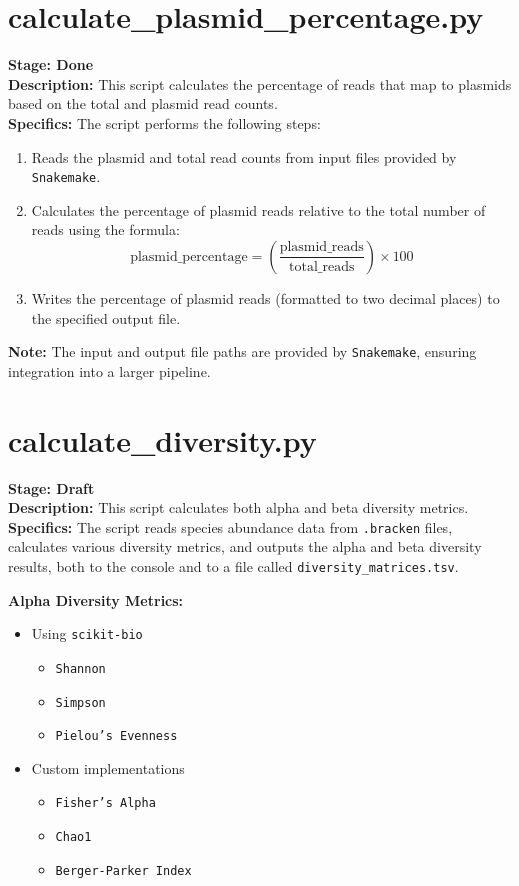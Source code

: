 \documentclass[11pt]{report}
\begin{document}
{\section{calculate\_plasmid\_percentage.py}
\textbf{Stage: Done} \\   
\textbf{Description:} This script calculates the percentage of reads that map to plasmids based on the total and plasmid read counts. \\
\textbf{Specifics:} The script performs the following steps:
\begin{enumerate}
	\item Reads the plasmid and total read counts from input files provided by \texttt{Snakemake}.
	\item Calculates the percentage of plasmid reads relative to the total number of reads using the formula: 
	\[ \text{plasmid\_percentage} = \left( \frac{\text{plasmid\_reads}}{\text{total\_reads}} \right) \times 100 \]
	\item Writes the percentage of plasmid reads (formatted to two decimal places) to the specified output file.
\end{enumerate}
\textbf{Note:} The input and output file paths are provided by \texttt{Snakemake}, ensuring integration into a larger pipeline. \\


\linenumbers*
\section{calculate\_diversity.py}
\textbf{Stage: Draft} \\   
\textbf{Description:} This script calculates both alpha and beta diversity metrics.\\
\textbf{Specifics:} The script reads species abundance data from \texttt{.bracken} files, calculates various diversity metrics, and outputs the alpha and beta diversity results, both to the console and to a file called \texttt{diversity\_matrices.tsv}.

\begin{multicols}{2}
	\textbf{Alpha Diversity Metrics:}
	\begin{itemize}
		\item Using \texttt{scikit-bio}
		\begin{itemize}
			\item \texttt{Shannon}
			\item \texttt{Simpson}
			\item \texttt{Pielou's Evenness}
		\end{itemize}
		\item Custom implementations
		\begin{itemize}
			\item \texttt{Fisher's Alpha}
			\item \texttt{Chao1}
			\item \texttt{Berger-Parker Index}
		\end{itemize}
	\end{itemize}
	

\end{multicols}}
\end{document}
